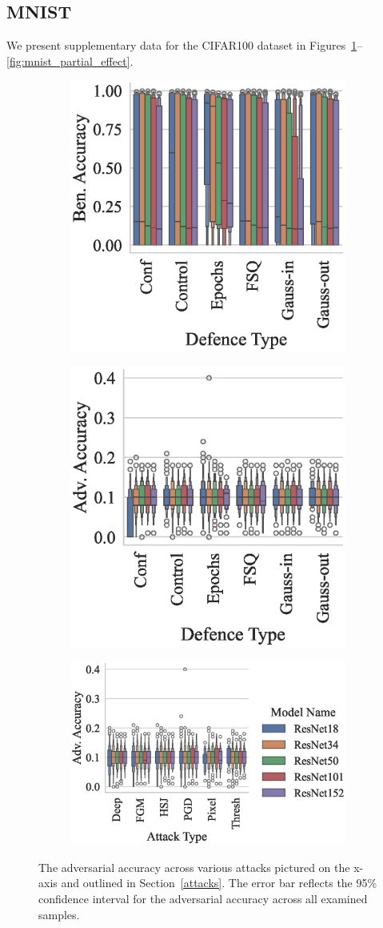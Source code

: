 \newpage
\subsection{MNIST}
We present supplementary data for the CIFAR100 dataset in Figures~\ref{fig:mnist_accuracies}--\ref{fig:mnist_partial_effect}.

\begin{figure}[!h]
\begin{subfigure}
    \centering
    \includegraphics[trim={0 5pt 0 10pt},clip,width=.27\textwidth]{mnist/ben_accuracy_vs_defence_type.eps}
\end{subfigure}
\begin{subfigure}
    \centering
    \includegraphics[trim={0 5pt 0 10pt},clip,width=.27\textwidth]{mnist/adv_accuracy_vs_defence_type.eps}
\end{subfigure}
\begin{subfigure}
    \centering
    \includegraphics[trim={0 5pt 0 10pt},clip,width=.4\textwidth]{mnist/adv_accuracy_vs_attack_type.eps}
\end{subfigure}
\caption{The adversarial accuracy across various attacks pictured on the x-axis and outlined in Section~\ref{attacks}. The error bar reflects the 95\% confidence interval for the adversarial accuracy across all examined samples.}
\label{fig:mnist_accuracies}
\end{figure}

